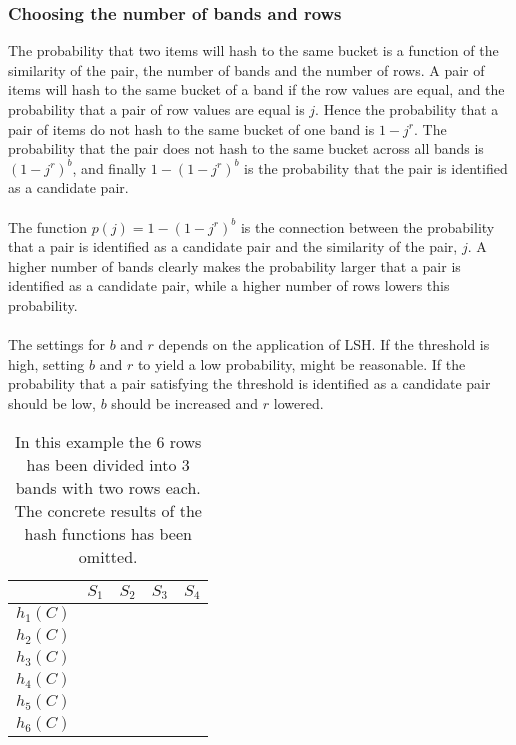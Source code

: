 \subsubsection{Choosing the number of bands and rows}
The probability that two items will hash to the same bucket is a function of the similarity of the pair, the number of bands and the number of rows. A pair of items will hash to the same bucket of a band if the row values are equal, and the probability that a pair of row values are equal is \(j\). Hence the probability that a pair of items do not hash to the same bucket of one band is \(1-j^r\). The probability that the pair does not hash to the same bucket across all bands is \((1-j^r)^b\), and finally \(1-(1-j^r)^b\) is the probability that the pair is identified as a candidate pair.\\ \\
The function \(p(j) = 1-(1-j^r)^b\) is the connection between the probability that a pair is identified as a candidate pair and the similarity of the pair, \(j\). A higher number of bands clearly makes the probability larger that a pair is identified as a candidate pair, while a higher number of rows lowers this probability.\\ \\
The settings for \(b\) and \(r\) depends on the application of LSH. If the threshold is high, setting \(b\) and \(r\) to yield a low probability, might be reasonable. If the probability that a pair satisfying the threshold is identified as a candidate pair should be low, \(b\) should be increased and \(r\) lowered.

\begin{table}[h]
\begin{tabular}{l||l|l|l|l}
& \(S_1\) & \(S_2\) & \(S_3\) & \(S_4\) \\ \hline \hline
\(h_1(C)\) & \cellcolor[HTML]{FD6864} & \cellcolor[HTML]{FD6864}
 & \cellcolor[HTML]{FD6864} & \cellcolor[HTML]{FD6864} \\ \hline
\(h_2(C)\) & \cellcolor[HTML]{FD6864} & \cellcolor[HTML]{FD6864}
 & \cellcolor[HTML]{FD6864} & \cellcolor[HTML]{FD6864} \\ \hline
\(h_3(C)\) & \cellcolor[HTML]{38FFF8} & \cellcolor[HTML]{38FFF8}
 & \cellcolor[HTML]{38FFF8} & \cellcolor[HTML]{38FFF8} \\ \hline
\(h_4(C)\) & \cellcolor[HTML]{38FFF8} & \cellcolor[HTML]{38FFF8}
 & \cellcolor[HTML]{38FFF8} & \cellcolor[HTML]{38FFF8} \\ \hline
\(h_5(C)\) & \cellcolor[HTML]{9AFF99} & \cellcolor[HTML]{9AFF99}
 & \cellcolor[HTML]{9AFF99} & \cellcolor[HTML]{9AFF99} \\ \hline
\(h_6(C)\) & \cellcolor[HTML]{9AFF99} & \cellcolor[HTML]{9AFF99}
 & \cellcolor[HTML]{9AFF99} & \cellcolor[HTML]{9AFF99}
\end{tabular}
\centering
\caption{In this example the 6 rows has been divided into 3 bands with two rows each. The concrete results of the hash functions has been omitted.}
\end{table}